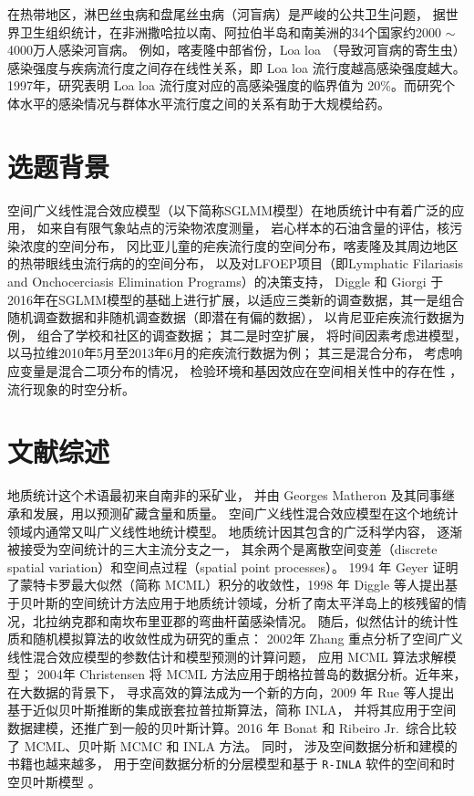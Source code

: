 \documentclass[hyperref, a4paper, UTF8, zihao = -4, linespread = 1.25, scheme = chinese]{ctexbook}
\begin{document}
在热带地区，淋巴丝虫病和盘尾丝虫病（河盲病）是严峻的公共卫生问题，
据世界卫生组织统计，在非洲撒哈拉以南、阿拉伯半岛和南美洲的34个国家约2000
\(\sim\) 4000万人感染河盲病\citep{Takougang2002Rapid}。
例如，喀麦隆中部省份，Loa loa
（导致河盲病的寄生虫）感染强度与疾病流行度之间存在线性关系，即 Loa loa
流行度越高感染强度越大\citep{Boussinesq2001}。1997年，研究表明 Loa loa
流行度对应的高感染强度的临界值为
20\%\citep{Gardon1997Serious}。而研究个体水平的感染情况与群体水平流行度之间的关系有助于大规模给药\citep{Schl2016Using}。

\section{选题背景}

空间广义线性混合效应模型（以下简称SGLMM模型）在地质统计中有着广泛的应用，
如来自有限气象站点的污染物浓度测量，
岩心样本的石油含量的评估，核污染浓度的空间分布\citep{Diggle1998}，
冈比亚儿童的疟疾流行度的空间分布\citep{Diggle2002}，喀麦隆及其周边地区的热带眼线虫流行病的的空间分布\citep{Diggle2007ATMP}，
以及对LFOEP项目（即Lymphatic Filariasis and Onchocerciasis Elimination
Programs）的决策支持\citep{Schl2016Using}， Diggle 和 Giorgi
于2016年在SGLMM模型的基础上进行扩展，以适应三类新的调查数据，其一是组合随机调查数据和非随机调查数据（即潜在有偏的数据），
以肯尼亚疟疾流行数据为例， 组合了学校和社区的调查数据； 其二是时空扩展，
将时间因素考虑进模型， 以马拉维2010年5月至2013年6月的疟疾流行数据为例；
其三是混合分布， 考虑响应变量是混合二项分布的情况\citep{Diggle2016}，
检验环境和基因效应在空间相关性中的存在性 \citep{spaMM2014}，
流行现象的时空分析\citep{surveillance2017}。

\section{文献综述}

地质统计这个术语最初来自南非的采矿业\citep{Krige1951}， 并由 Georges
Matheron 及其同事继承和发展，用以预测矿藏含量和质量。
空间广义线性混合效应模型在这个地统计领域内通常又叫广义线性地统计模型。
地质统计因其包含的广泛科学内容，
逐渐被接受为空间统计的三大主流分支之一，
其余两个是离散空间变差（discrete spatial
variation）和空间点过程（spatial point processes）\citep{Cressie1993}。
1994 年 Geyer 证明了蒙特卡罗最大似然（简称
MCML）积分的收敛性\citep{Geyer1994On}，1998 年 Diggle
等人提出基于贝叶斯的空间统计方法应用于地质统计领域，分析了南太平洋岛上的核残留的情况，北拉纳克郡和南坎布里亚郡的弯曲杆菌感染情况\citep{Diggle1998}。
随后，似然估计的统计性质和随机模拟算法的收敛性成为研究的重点： 2002年
Zhang 重点分析了空间广义线性混合效应模型的参数估计和模型预测的计算问题，
应用 MCML \citep{Zhang2002On} 算法求解模型； 2004年 Christensen 将 MCML
方法应用于朗格拉普岛的数据分析\citep{Christensen2004}。近年来，在大数据的背景下，
寻求高效的算法成为一个新的方向，2009 年 Rue
等人提出基于近似贝叶斯推断的集成嵌套拉普拉斯算法，简称
INLA\citep{INLA2009}，
并将其应用于空间数据建模\citep{INLA2015}，还推广到一般的贝叶斯计算\citep{INLA2017}。2016
年 Bonat 和 Ribeiro Jr.~综合比较了 MCML、贝叶斯 MCMC 和 INLA
方法\citep{Bonat2016Practical}。 同时，
涉及空间数据分析和建模的书籍也越来越多，
用于空间数据分析的分层模型\citep{Banerjee2015}和基于 \texttt{R-INLA}
软件的空间和时空贝叶斯模型 \citep{Blangiardo2015}。
\end{document}
